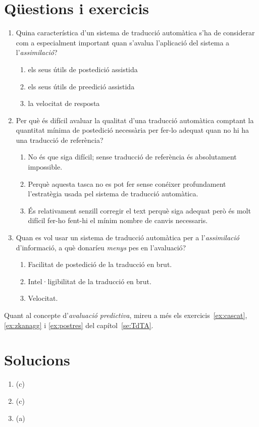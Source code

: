 \section{Qüestions i exercicis}

\begin{enumerate}
\item Quina característica d'un sistema de traducció automàtica
   s'ha de considerar com a especialment important quan s'avalua
   l'aplicació del sistema a l'\emph{assimilació}?
   
\begin{enumerate}
\item els seus útils de postedició assistida
\item els seus útils de preedició assistida
\item la velocitat de resposta
\end{enumerate}

\item Per què és difícil avaluar la qualitat d'una traducció automàtica
   comptant la quantitat mínima de postedició necessària per fer-lo adequat
   quan no hi ha una traducció de referència?
   
\begin{enumerate}
\item No és que siga difícil; sense
      traducció de referència és absolutament impossible.
\item Perquè aquesta tasca no es pot fer sense conéixer
      profundament l'estratègia usada pel sistema de traducció
      automàtica.
\item És relativament senzill corregir el text perquè
      siga adequat però és molt difícil fer-ho fent-hi el mínim nombre
      de canvis necessaris.
\end{enumerate}

\item Quan es vol usar un sistema de traducció automàtica per a
  l'\emph{assimilació} d'informació, a què donaríeu \emph{menys} pes
  en l'avaluació?
   
\begin{enumerate}
\item Facilitat de postedició de la traducció en brut.
\item Intel·ligibilitat de la traducció en brut.
\item Velocitat.
\end{enumerate}



\end{enumerate}

Quant al concepte d'\emph{avaluació predictiva}, mireu a més els
exercicis~\ref{ex:cascat}, \ref{ex:zkanagg} i \ref{ex:postres} del capítol~\ref{se:TdTA}.


\section{Solucions}


\begin{enumerate}
\item (c)
\item (c)
\item (a)


\end{enumerate}


